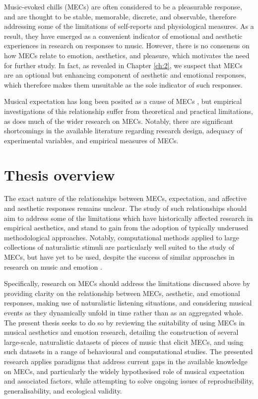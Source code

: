 Music-evoked chills (MECs) are often considered to be a pleasurable response, and are thought to be stable, memorable, discrete, and observable, therefore addressing some of the limitations of self-reports and physiological measures. As a result, they have emerged as a convenient indicator of emotional and aesthetic experiences in research on responses to music. However, there is no consensus on how MECs relate to emotion, aesthetics, and pleasure, which motivates the need for further study. In fact, as revealed in Chapter \ref{ch:2}, we suspect that MECs are an optional but enhancing component of aesthetic and emotional responses, which therefore makes them unsuitable as the sole indicator of such responses.

Musical expectation has long been posited as a cause of MECs \parencite{harrison2014, huron2006, huron2010, juslin2013, juslin2008, mcdermott2012, mencke2019, pearce2012, salimpoor2011, sloboda1991}, but empirical investigations of this relationship suffer from theoretical and practical limitations, as does much of the wider research on MECs. Notably, there are significant shortcomings in the available literature regarding research design, adequacy of experimental variables, and empirical measures of MECs.

\section{Thesis overview}

The exact nature of the relationships between MECs, expectation, and affective and aesthetic responses remains unclear. The study of such relationships should aim to address some of the limitations which have historically affected research in empirical aesthetics, and stand to gain from the adoption of typically underused methodological approaches. Notably, computational methods applied to large collections of naturalistic stimuli are particularly well suited to the study of MECs, but have yet to be used, despite the success of similar approaches in research on music and emotion \parencite[e.g.,][]{eerola2011}.

Specifically, research on MECs should address the limitations discussed above by providing clarity on the relationship between MECs, aesthetic, and emotional responses, making use of naturalistic listening situations, and considering musical events as they dynamically unfold in time rather than as an aggregated whole. The present thesis seeks to do so by reviewing the suitability of using MECs in musical aesthetics and emotion research, detailing the construction of several large-scale, naturalistic datasets of pieces of music that elicit MECs, and using such datasets in a range of behavioural and computational studies. The presented research applies paradigms that address current gaps in the available knowledge on MECs, and particularly the widely hypothesised role of musical expectation and associated factors, while attempting to solve ongoing issues of reproducibility, generalisability, and ecological validity.

